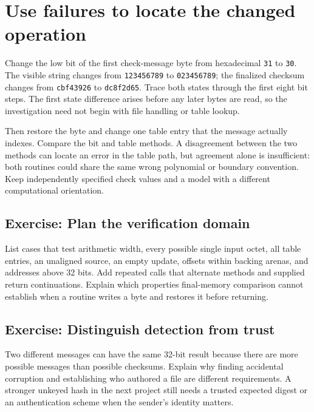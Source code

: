 \section{Use failures to locate the changed operation}
Change the low bit of the first check-message byte from hexadecimal \texttt{31} to
\texttt{30}. The visible string changes from \texttt{123456789} to
\texttt{023456789}; the finalized checksum changes from \texttt{cbf43926} to
\texttt{dc8f2d65}. Trace both states through the first eight bit steps. The first
state difference arises before any later bytes are read, so the investigation need
not begin with file handling or table lookup.

Then restore the byte and change one table entry that the message actually indexes.
Compare the bit and table methods. A disagreement between the two methods can locate
an error in the table path, but agreement alone is insufficient: both routines could
share the same wrong polynomial or boundary convention. Keep independently specified
check values and a model with a different computational orientation.

\subsection*{Exercise: Plan the verification domain}
List cases that test arithmetic width, every possible single input octet, all table
entries, an unaligned source, an empty update, offsets within backing arenas, and
addresses above 32 bits. Add repeated calls that alternate methods and supplied return
continuations. Explain which properties final-memory comparison cannot establish when
a routine writes a byte and restores it before returning.

\subsection*{Exercise: Distinguish detection from trust}
Two different messages can have the same 32-bit result because there are more possible
messages than possible checksums. Explain why finding accidental corruption and
establishing who authored a file are different requirements. A stronger unkeyed hash
in the next project still needs a trusted expected digest or an authentication scheme
when the sender's identity matters.

